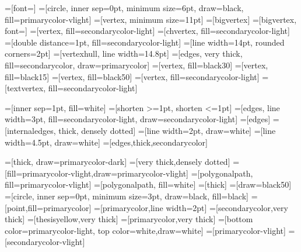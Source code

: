 \usetikzlibrary{arrows}
\usetikzlibrary{decorations.text}
\usetikzlibrary{decorations.pathmorphing}
\usetikzlibrary{through}
\usetikzlibrary{intersections}
\tikzset{>=stealth'}

=[font=\small]
=[circle, inner sep=0pt, minimum size=6pt, draw=black, fill=primarycolor-vlight]
=[vertex, minimum size=11pt]
=[bigvertex]
=[bigvertex, font=\footnotesize]
=[vertex, fill=secondarycolor-light]
=[chvertex, fill=secondarycolor-light]
=[double distance=1pt, fill=secondarycolor-light]
=[line width=14pt, rounded corners=2pt]
=[vertexhull, line width=14.8pt]
=[edges, very thick, fill=secondarycolor, draw=primarycolor]
=[vertex, fill=black30]
=[vertex, fill=black15]
=[vertex, fill=black50]
=[vertex, fill=secondarycolor-light]
=[textvertex, fill=secondarycolor-light]

=[inner sep=1pt, fill=white]
=[shorten >=1pt, shorten <=1pt]
=[edges, line width=3pt, fill=secondarycolor-light, draw=secondarycolor-light]
=[edges]
=[internaledges, thick, densely dotted]
=[line width=2pt, draw=white]
=[line width=4.5pt, draw=white]
=[edges,thick,secondarycolor]

=[thick, draw=primarycolor-dark]
=[very thick,densely dotted]
=[fill=primarycolor-vlight,draw=primarycolor-vlight]
=[polygonalpath, fill=primarycolor-vlight]
=[polygonalpath, fill=white]
=[thick]
=[draw=black50]
=[circle, inner sep=0pt, minimum size=3pt, draw=black, fill=black]
=[point,fill=primarycolor]
=[primarycolor,line width=2pt]
=[secondarycolor,very thick]
=[thesisyellow,very thick]
=[primarycolor,very thick]
=[bottom color=primarycolor-light, top color=white,draw=white]
=[primarycolor-vlight]
=[secondarycolor-vlight]

